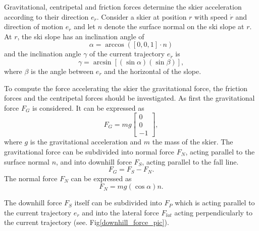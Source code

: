 \documentclass[12pt,a4paper,twoside]{book}
\begin{document}
Gravitational, centripetal and friction forces determine the skier acceleration according to their direction $e_{\dot{r}}$. Consider a skier at position $r$ with speed $\dot{r}$ and direction of motion $e_{\dot{r}}$ and let $n$ denote the surface normal on the ski slope at $r$. At $r$, the ski slope has an inclination angle of
\begin{equation}
\alpha =\arccos(\left[0,0,1\right] \cdot n)
\end{equation}
and the inclination angle $\gamma$ of the current trajectory $e_{\dot{r}}$ is
\begin{equation}\label{incl_angle}
\gamma =\arcsin[(\sin \alpha )(\sin \beta )],
\end{equation}
where $\beta$ is the angle between $e_{\dot{r}}$ and the horizontal of the slope.

To compute the force accelerating the skier the gravitational force, the friction forces and the centripetal forces should be investigated. As first the gravitational force $F_G$ is considered. It can be expressed as
\begin{equation}
F_G=mg\left[\begin{matrix}0\\0\\-1\end{matrix}\right],
\end{equation}
where $g$ is the gravitational acceleration and $m$ the mass of the skier. The gravitational force can be subdivided into normal force $F_N$, acting parallel to the surface normal $n$, and into downhill force $F_S$, acting parallel to the fall line.
\begin{equation}\label{downhill_force}
F_G=F_S-F_N.
\end{equation}
The normal force $F_N$ can be expressed as
\begin{equation}
F_N=mg(\cos \alpha )n.
\end{equation}

The  downhill force $F_S$ itself can be subdivided into $F_P$ which is acting parallel to the current trajectory $e_{\dot{r}}$ and into the lateral force $F_{lat}$ acting perpendicularly to the current trajectory (see. Fig\ref{downhill_force_pic}).
\end{document}
